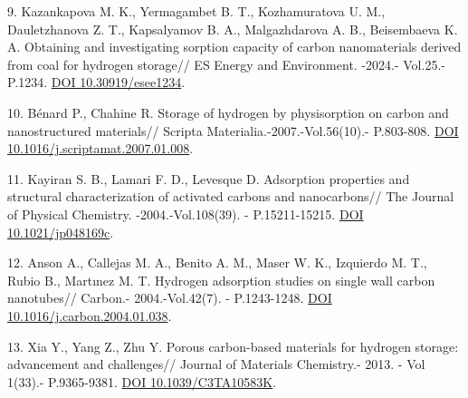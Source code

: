 \begin{refs}
9. Kazankapova M. K., Yermagambet B. T., Kozhamuratova U. M.,
Dauletzhanova Z. T., Kapsalyamov B. A., Malgazhdarova A. B., Beisembaeva
K. A. Obtaining and investigating sorption capacity of carbon
nanomaterials derived from coal for hydrogen storage// ES Energy and
Environment. -2024.- Vol.25.- P.1234.
\href{https://dx.doi.org/10.30919/esee1234}{DOI 10.30919/esee1234}.

10. Bénard P., Chahine R. Storage of hydrogen by physisorption on carbon
and nanostructured materials// Scripta Materialia.-2007.-Vol.56(10).-
P.803-808.
\href{https://doi.org/10.1016/j.scriptamat.2007.01.008}{DOI
10.1016/j.scriptamat.2007.01.008}.

11. Kayiran S. B., Lamari F. D., Levesque D. Adsorption properties and
structural characterization of activated carbons and nanocarbons// The
Journal of Physical Chemistry. -2004.-Vol.108(39). - P.15211-15215.
\href{https://doi.org/10.1021/jp048169c}{DOI 10.1021/jp048169c}.

12. Anson A., Callejas M. A., Benito A. M., Maser W. K., Izquierdo M.
T., Rubio B., Martınez M. T. Hydrogen adsorption studies on single wall
carbon nanotubes// Carbon.- 2004.-Vol.42(7). - P.1243-1248.
\href{https://doi.org/10.1016/j.carbon.2004.01.038}{DOI
10.1016/j.carbon.2004.01.038}.

13. Xia Y., Yang Z., Zhu Y. Porous carbon-based materials for hydrogen
storage: advancement and challenges// Journal of Materials Chemistry.-
2013. - Vol 1(33).- P.9365-9381.
\href{https://doi.org/10.1039/C3TA10583K}{DOI 10.1039/C3TA10583K}.
\end{refs}

